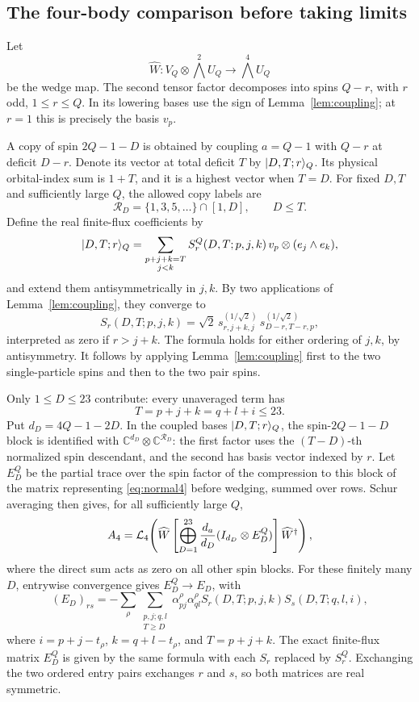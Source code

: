 \subsection{The four-body comparison before taking limits}
Let
\[
 \widehat W:V_Q\otimes\bigwedge^2U_Q\longrightarrow\bigwedge^4U_Q
\]
be the wedge map. The second tensor factor decomposes into spins $Q-r$, with $r$ odd, $1\le r\le Q$. In its lowering bases use the sign of Lemma~\ref{lem:coupling}; at $r=1$ this is precisely the basis $v_p$.

A copy of spin $2Q-1-D$ is obtained by coupling $a=Q-1$ with $Q-r$ at deficit $D-r$. Denote its vector at total deficit $T$ by $\lvert D,T;r\rangle_Q$. Its physical orbital-index sum is $1+T$, and it is a highest vector when $T=D$. For fixed $D,T$ and sufficiently large $Q$, the allowed copy labels are
\[
 \mathcal R_D=\{1,3,5,\ldots\}\cap[1,D],\qquad D\le T.
\]
Define the real finite-flux coefficients by
\[
 \lvert D,T;r\rangle_Q=\sum_{\substack{p+j+k=T\\j<k}}
 S_r^Q(D,T;p,j,k)\,v_p\otimes(e_j\wedge e_k),
\]
and extend them antisymmetrically in $j,k$. By two applications of Lemma~\ref{lem:coupling}, they converge to
\begin{equation}\label{eq:S}
 S_r(D,T;p,j,k)=\sqrt2\,
 s^{(1/\sqrt2)}_{r,j+k,j}\,
 s^{(1/\sqrt2)}_{D-r,T-r,p},
\end{equation}
interpreted as zero if $r>j+k$. The formula holds for either ordering of $j,k$, by antisymmetry. It follows by applying Lemma~\ref{lem:coupling} first to the two single-particle spins and then to the two pair spins.

Only $1\le D\le23$ contribute: every unaveraged term has
\[
 T=p+j+k=q+l+i\le23.
\]
Put $d_D=4Q-1-2D$. In the coupled bases $\lvert D,T;r\rangle_Q$, the
spin-$2Q-1-D$ block is identified with
$\mathbb C^{d_D}\otimes\mathbb C^{\mathcal R_D}$: the first factor uses the
$(T-D)$-th normalized spin descendant, and the second has basis vector
indexed by $r$. Let $E_D^Q$ be the partial trace over the spin factor of
the compression to this block of the matrix representing \eqref{eq:normal4}
before wedging, summed over rows. Schur averaging then gives, for all sufficiently large $Q$,
\begin{equation}\label{eq:A4}
 A_4=\mathcal L_4\!\left(\widehat W
   \left[\bigoplus_{D=1}^{23}\frac{d_a}{d_D}
       (I_{d_D}\otimes E_D^Q)\right]\widehat W^\dagger\right),
\end{equation}
where the direct sum acts as zero on all other spin blocks.
For these finitely many $D$, entrywise convergence gives $E_D^Q\to E_D$, with
\begin{equation}\label{eq:E}
 (E_D)_{rs}=-\sum_\rho\sum_{\substack{p,j;q,l\\T\ge D}}
 \alpha^{\rho}_{pj}\alpha^{\rho}_{ql}
 S_r(D,T;p,j,k)S_s(D,T;q,l,i),
\end{equation}
where $i=p+j-t_\rho$, $k=q+l-t_\rho$, and $T=p+j+k$. The exact finite-flux matrix $E_D^Q$ is given by the same formula with each $S_r$ replaced by $S_r^Q$. Exchanging the two ordered entry pairs exchanges $r$ and $s$, so both matrices are real symmetric.

